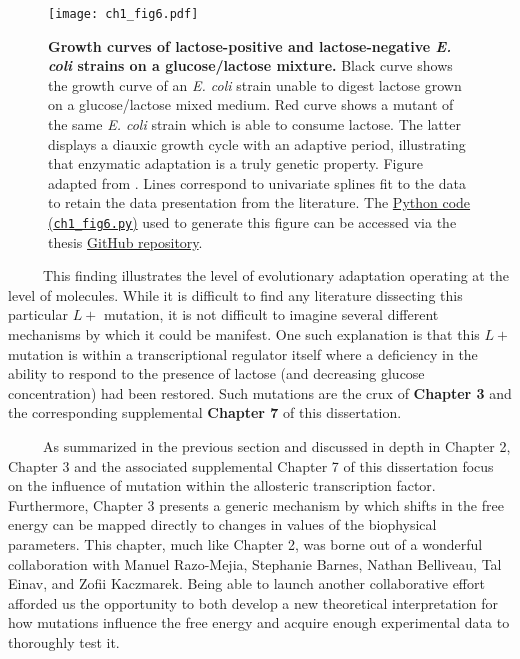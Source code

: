 \documentclass[12pt]{caltech_thesis}
\begin{document}
\hypertarget{fig:lacneg}{%
\begin{figure}
\centering
\texttt{[image: ch1\_fig6.pdf]}
\caption[{Growth curves of lactose-positive and lactose-negative
\emph{E. coli} strains.}]{\textbf{Growth curves of lactose-positive and
lactose-negative \emph{E. coli} strains on a glucose/lactose mixture.}
Black curve shows the growth curve of an \emph{E. coli} strain unable to
digest lactose grown on a glucose/lactose mixed medium. Red curve shows
a mutant of the same \emph{E. coli} strain which is able to consume
lactose. The latter displays a diauxic growth cycle with an adaptive
period, illustrating that enzymatic adaptation is a truly genetic
property. Figure adapted from \textcite{monod1947}. Lines correspond to
univariate splines fit to the data to retain the data presentation from
the literature. The
\href{https://github.com/gchure/phd/blob/master/src/chapter_01/code/ch1_fig6.py}{Python
code (\texttt{ch1\_fig6.py})} used to generate this figure can be
accessed via the thesis \href{https://github.com/gchure/phd}{GitHub
repository}.}
\label{fig:lacneg}
\end{figure}
}

~~~~~This finding illustrates the level of evolutionary adaptation
operating at the level of molecules. While it is difficult to find any
literature dissecting this particular \(L+\) mutation, it is not
difficult to imagine several different mechanisms by which it could be
manifest. One such explanation is that this \(L+\) mutation is within a
transcriptional regulator itself where a deficiency in the ability to
respond to the presence of lactose (and decreasing glucose
concentration) had been restored. Such mutations are the crux of
\textbf{Chapter 3} and the corresponding supplemental \textbf{Chapter 7}
of this dissertation.

~~~~~As summarized in the previous section and discussed in depth in
Chapter 2, Chapter 3 and the associated supplemental Chapter 7 of this
dissertation focus on the influence of mutation within the allosteric
transcription factor. Furthermore, Chapter 3 presents a generic
mechanism by which shifts in the free energy can be mapped directly to
changes in values of the biophysical parameters. This chapter, much like
Chapter 2, was borne out of a wonderful collaboration with Manuel
Razo-Mejia, Stephanie Barnes, Nathan Belliveau, Tal Einav, and Zofii
Kaczmarek. Being able to launch another collaborative effort afforded us
the opportunity to both develop a new theoretical interpretation for how
mutations influence the free energy and acquire enough experimental data
to thoroughly test it.
\end{document}
